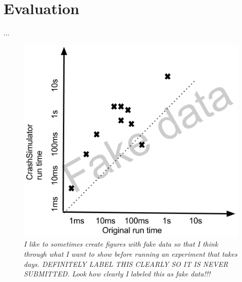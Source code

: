 \section{Evaluation}
\label{sec-evaluation}

 
...

\begin{figure}[t]
  \center{}
  \includegraphics[scale=.5]{images/FakeTimeEval}
  \caption{\emph{I like to sometimes create figures with fake data so that I 
think through what I want to show before running an experiment that takes 
days.  DEFINITELY LABEL THIS CLEARLY SO IT IS NEVER SUBMITTED.  Look how 
clearly I labeled this as fake data!!!}
  \label{fig-time-eval} }
\end{figure}
